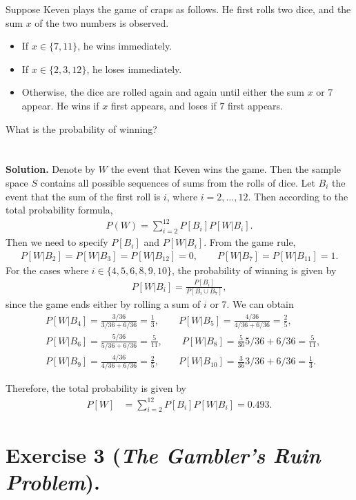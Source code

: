 Suppose Keven plays the game of craps as follows. He first rolls two dice, and the sum $x$ of the two numbers is observed.
\begin{itemize}
	\item If $x \in \{7, 11\}$, he wins immediately.
	\item If $x\in \{2, 3, 12\}$, he loses immediately.
	\item Otherwise, the dice are rolled again and again until either the sum $x$ or 7 appear. He wins if $x$ first appears, and loses if $7$ first appears.
\end{itemize}
What is the probability of winning?\\
~\\
~\\
\textbf{Solution.} Denote by $W$ the event that Keven wins the game. Then the sample space $S$ contains all possible sequences of sums from the rolls of dice. Let $B_i$ the event that the sum of the first roll is $i$, where $i = 2, \ldots, 12$. Then according to the total probability formula, 
\begin{align*}
P(W) = \sum_{i=2}^{12} P[B_i]P[W|B_i].
\end{align*}
Then we need to specify $P[B_i]$ and $P[W|B_i]$. From the game rule,
\begin{align*}
P[W|B_2] = P[W|B_3] = P[W|B_{12}] = 0, \qquad P[W|B_7] = P[W|B_{11}] = 1.
\end{align*}
For the cases where $i\in \{4, 5, 6, 8, 9, 10\}$, the probability of winning is given by
\begin{align*}
P[W|B_i] = \frac{P[B_i]}{P[B_i\cup B_7]},
\end{align*}
since the game ends either by rolling a sum of $i$ or 7. We can obtain
\begin{align*}
& P[W|B_4] = \frac{3/36}{3/36 + 6/36} = \frac{1}{3}, \qquad P[W|B_5] = \frac{4/36}{4/36 + 6/36} = \frac{2}{5}, \\
& P[W|B_6] = \frac{5/36}{5/36 + 6/36} = \frac{5}{11}, \qquad P[W|B_8] = \frac{5}{36}{5/36 + 6/36} = \frac{5}{11}, \\
& P[W|B_9] = \frac{4/36}{4/36 + 6/36} = \frac{2}{5}, \qquad P[W|B_{10}] = \frac{3}{36}{3/36 + 6/36} = \frac{1}{3}.
\end{align*}

Therefore, the total probability is given by
\begin{align*}
P[W] & = \sum_{i=2}^{12} P[B_i]P[W|B_i] = 0.493.
\end{align*}

\section*{Exercise 3 (\emph{The Gambler's Ruin Problem}).}

